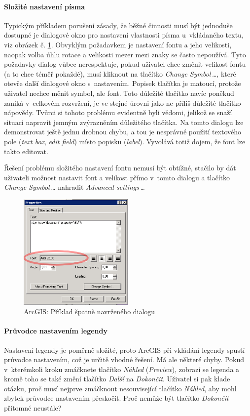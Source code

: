 \documentclass[a4paper,12pt,draft]{article}
\begin{document}
\paragraph*{Složité nastavení písma}  Typickým příkladem porušení
zásady, že běžné činnosti musí být jednoduše dostupné je dialogové
okno pro nastavení vlastnosti písma u~vkládaného textu, viz obrázek
č. \ref{fig:ArcGIS_text_dialog}. Obvyklým požadavkem je nastavení
fontu a jeho velikosti, naopak volba úhlu rotace a velikosti mezer mezi
znaky se často nepoužívá. Tyto požadavky dialog vůbec nerespektuje,
pokud uživatel chce změnit velikost fontu (a to chce téměř pokaždé),
musí kliknout na tlačítko \emph{Change Symbol\,\ldots}, které otevře
další dialogové okno s~nastavením. Popisek tlačítka je matoucí,
protože uživatel nechce měnit symbol, ale font. Toto důležité
tlačítko navíc poněkud zaniká v~celkovém rozvržení, je ve stejné
úrovni jako ne příliš důležité tlačítko nápovědy. Tvůrci si
tohoto problému evidentně byli vědomi, jelikož se snaží situaci
napravit jemným zvýrazněním důležitého tlačítka. Na tomto dialogu
lze demonstrovat ještě jednu drobnou chybu,
a tou je nesprávné použití textového pole (\emph{text box}, \emph{edit field})
místo
popisku (\emph{label}). Vyvolává totiž dojem, že font lze takto editovat.

Řešení problému složitého nastavení fontu nemusí být obtížné,
stačilo by dát uživateli možnost nastavit font a velikost přímo
v~tomto dialogu a tlačítko \emph{Change Symbol\,\ldots} nahradit \emph{Advanced
settings\,\ldots}

\begin{figure}[h!]
    \centering
    \includegraphics[width=0.5\textwidth]{./GUI_screenshots/ArcGIS_text_dialog.png}
    \caption{ArcGIS: Příklad špatně navrženého dialogu}
    \label{fig:ArcGIS_text_dialog}
\end{figure}

\paragraph*{Průvodce nastavením legendy}  Nastavení legendy je poměrně
složité, proto ArcGIS při vkládání legendy spustí průvodce nastavením,
což je určitě vhodné řešení. Má ale některé chyby. Pokud
v~kterémkoli kroku zmáčknete tlačítko \emph{Náhled} (\emph{Preview}),
zobrazí se legenda a kromě toho se také změní tlačítko \emph{Další}
na \emph{Dokončit}. Uživatel si pak klade otázku, proč musí nejprve
zmáčknout nesouvisející tlačítko \emph{Náhled}, aby mohl zbytek
průvodce nastavením přeskočit. Proč nemůže být tlačítko
\emph{Dokončit} přítomné neustále?
\end{document}
